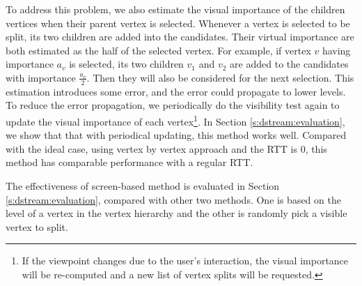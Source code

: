     To address this problem, we also estimate the visual importance of the children vertices
    when their parent vertex is selected. Whenever a vertex is selected to be split, its two children
    are added into the candidates. Their virtual importance are both estimated as the half
    of the selected vertex. For example, if vertex $v$ having importance $a_v$ is selected,
    its two children $v_1$ and $v_2$ are added to the candidates with importance $\frac{a_v}{2}$.
    Then they will also be considered for the next selection.
    This estimation introduces some error, and the error could propagate to
    lower levels. To reduce the error propagation, 
    we periodically do the visibility test again to update the visual importance of 
    each vertex\footnote{ 
    If the viewpoint changes due to the user's interaction, the visual importance will
    be re-computed and a new list of vertex splits will be requested. 
    }.
    In Section \ref{s:dstream:evaluation}, we show that
    that with periodical updating, this method works well. Compared with the ideal case,
    using vertex by vertex approach and the RTT is $0$, this method has comparable performance
    with a regular RTT.

    The effectiveness of screen-based method is evaluated in Section \ref{s:dstream:evaluation},
    compared with other two methods. One is based on the level of a vertex in the 
    vertex hierarchy and the other is randomly pick a visible vertex to split.

    
    
